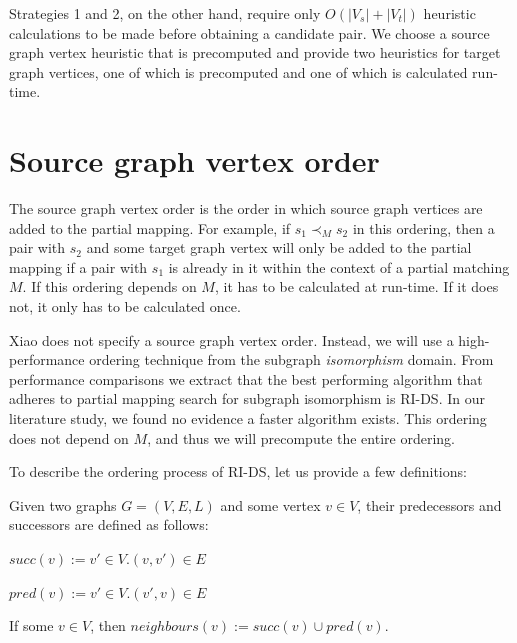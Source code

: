 Strategies 1 and 2, on the other hand, require only $O(|V_s|+|V_t|)$ heuristic calculations to be made before obtaining a candidate pair. We choose a source graph vertex heuristic that is precomputed and provide two heuristics for target graph vertices, one of which is precomputed and one of which is calculated run-time.

\section{Source graph vertex order}
\label{sec:sourceOrder}
The source graph vertex order is the order in which source graph vertices are added to the partial mapping. For example, if $s_1 \prec_M s_2$ in this ordering, then a pair with $s_2$ and some target graph vertex will only be added to the partial mapping if a pair with $s_1$ is already in it within the context of a partial matching $M$. If this ordering depends on $M$, it has to be calculated at run-time. If it does not, it only has to be calculated once.

Xiao does not specify a source graph vertex order. Instead, we will use a high-performance ordering technique from the subgraph \textit{isomorphism} domain. From performance comparisons we extract that the best performing algorithm that adheres to partial mapping search for subgraph isomorphism is RI-DS. In our literature study, we found no evidence a faster algorithm exists. This ordering does not depend on $M$, and thus we will precompute the entire ordering.

To describe the ordering process of RI-DS, let us provide a few definitions:

\begin{defn}
Given two graphs $G=(V, E, L)$ and some vertex $v \in V$, their predecessors and successors are defined as follows:

$\mathit{succ}(v) := {v' \in V . (v, v') \in E}$

$\mathit{pred}(v) := {v' \in V . (v', v) \in E}$
 
\end{defn}

\begin{defn}
If some $v\in V$, then $\mathit{neighbours}(v):= \mathit{succ}(v) \cup \mathit{pred}(v)$.
\end{defn}



